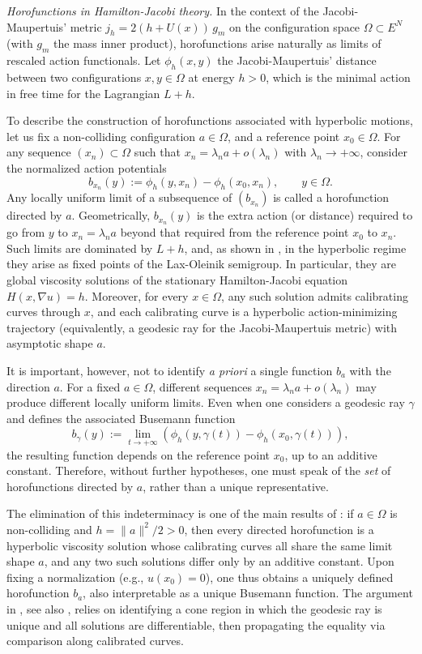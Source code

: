 \documentclass[a4paper,10pt]{amsart}
\theoremstyle{plain}
\theoremstyle{definition}
\numberwithin{equation}{section}
\numberwithin{thm}{section}
\begin{document}
{\em Horofunctions in Hamilton-Jacobi theory.} In the context of the Jacobi-Maupertuis' metric $j_h = 2(h+U(x))\,g_m$ on the configuration space $\Omega \subset E^N$ (with $g_m$ the mass inner product), horofunctions arise naturally as limits of rescaled action functionals. Let $\phi_h(x,y)$  the Jacobi-Maupertuis' distance between two configurations $x,y \in \Omega$ at energy $h>0$, which  is the minimal action in free time for the Lagrangian $L+h$.

To describe the construction of horofunctions associated with hyperbolic motions, let us fix  a non-colliding configuration \( a \in \Omega \), and a reference point \( x_0 \in \Omega \). For any sequence \( (x_n) \subset \Omega \) such that \( x_n = \lambda_n a + o(\lambda_n) \) with \( \lambda_n \to +\infty \), consider the normalized action potentials
\[
b_{x_n}(y) := \phi_h(y, x_n) - \phi_h(x_0, x_n), \qquad y \in \Omega.
\]
Any locally uniform limit of a subsequence of \( (b_{x_n}) \) is called a horofunction directed by \( a \). Geometrically, $b_{x_n}(y)$ is the extra action (or distance) required to go from $y$ to $x_n=\lambda_n a $ beyond that required from the reference point $x_0$ to $x_n$. Such limits are dominated by \( L + h \), and, as shown in \cite{MadernaVenturelli_HyperbolicMotions}, in the hyperbolic regime they arise as fixed points of the Lax-Oleinik semigroup. In particular, they are global viscosity solutions of the stationary Hamilton-Jacobi equation \( H(x, \nabla u) = h \). Moreover, for every \( x \in \Omega \), any such solution admits calibrating curves through \( x \), and  each calibrating curve is a hyperbolic action-minimizing trajectory (equivalently, a geodesic ray for the Jacobi-Maupertuis metric) with asymptotic shape \( a \).

It is important, however, not to identify \emph{a priori} a single function \( b_a \) with the direction \( a \). For a fixed \( a \in \Omega \), different sequences \( x_n = \lambda_n a + o(\lambda_n) \) may produce different locally uniform limits. Even when one considers a geodesic ray \( \gamma \) and defines the associated Busemann function
\[
b_\gamma(y) := \lim_{t \to +\infty} \left( \phi_h(y, \gamma(t)) - \phi_h(x_0, \gamma(t)) \right),
\]
the resulting function depends on the reference point \( x_0 \), up to an additive constant. Therefore, without further hypotheses, one must speak of the \emph{set} of horofunctions directed by \( a \), rather than a unique representative.

The elimination of this indeterminacy is one of the main results of \cite{MadernaVenturelli_2026}: if \( a \in \Omega \) is non-colliding and \( h = \|a\|^2 / 2 > 0 \), then every directed horofunction is a hyperbolic viscosity solution whose calibrating curves all share the same limit shape \( a \), and any two such solutions differ only by an additive constant. Upon fixing a normalization (e.g., \( u(x_0) = 0 \)), one thus obtains a uniquely defined horofunction \( b_a \), also interpretable as a unique Busemann function. The argument in \cite{MadernaVenturelli_2026}, see also \cite{PercinoSanchez2014}, relies on identifying a cone region in which the geodesic ray is unique and all solutions are differentiable, then propagating the equality via comparison along calibrated curves.
\end{document}
